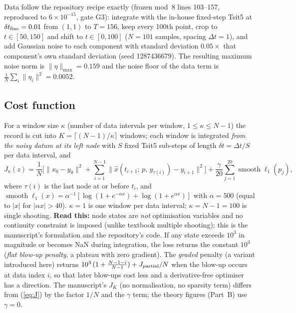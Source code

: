 \documentclass[10pt]{article}
\newcommand{\readthis}[1]{\textbf{Read this:} #1}
\begin{document}
Data follow the repository recipe exactly (frozen mod~8 lines 103--157, reproduced to $6\times10^{-15}$, gate G3): integrate with the in-house fixed-step Tsit5 at $\delta t_{\rm fine}=0.01$ from $(1,1)$ to $T=156$, keep every 100th point, crop to $t\in[50,150]$ and shift to $t\in[0,100]$ ($N=101$ samples, spacing $\Delta t=1$), and add Gaussian noise to each component with standard deviation $0.05\times$ that component's own standard deviation (seed 1287436679). The resulting maximum noise norm is $\lVert\eta\rVert_{\max}=0.159$ and the noise floor of the data term is $\tfrac1N\sum_i\lVert\eta_i\rVert^2=0.0052$.

\subsection{Cost function}
For a window size $\kappa$ (number of data intervals per window, $1\le\kappa\le N-1$) the record is cut into $K=\lceil (N-1)/\kappa\rceil$ windows; each window is integrated \emph{from the noisy datum at its left node} with $S$ fixed Tsit5 sub-steps of length $\delta t=\Delta t/S$ per data interval, and
\begin{equation}
J_\kappa(z)=\frac{1}{N}\Big[\lVert x_0-y_0\rVert^2+\sum_{i=1}^{N-1}\big\lVert \hat x(t_{i+1};\,p,\,y_{\tau(i)})-y_{i+1}\big\rVert^2\Big]+\frac{\gamma}{20}\sum_{j=1}^{20}\operatorname{smooth}\ell_1(p_j),
\label{eq:J}
\end{equation}
where $\tau(i)$ is the last node at or before $t_i$, and $\operatorname{smooth}\ell_1(x)=\alpha^{-1}[\log(1+e^{-\alpha x})+\log(1+e^{\alpha x})]$ with $\alpha=500$ (equal to $|x|$ for $|\alpha x|>40$). $\kappa=1$ is one window per data interval; $\kappa=N-1=100$ is single shooting. \readthis{node states are \emph{not} optimisation variables and no continuity constraint is imposed (unlike textbook multiple shooting); this is the manuscript's formulation and the repository's code.} If any state exceeds $10^3$ in magnitude or becomes NaN during integration, the loss returns the constant $10^3$ (\emph{flat blow-up penalty}, a plateau with zero gradient). The \emph{graded} penalty (a variant introduced here) returns $10^3\,(1+\tfrac{N-1-i}{N-1})+J_{\rm partial}/N$ when the blow-up occurs at data index $i$, so that later blow-ups cost less and a derivative-free optimiser has a direction. The manuscript's $J_K$ (no normalisation, no sparsity term) differs from (\ref{eq:J}) by the factor $1/N$ and the $\gamma$ term; the theory figures (Part~B) use $\gamma=0$.
\end{document}
